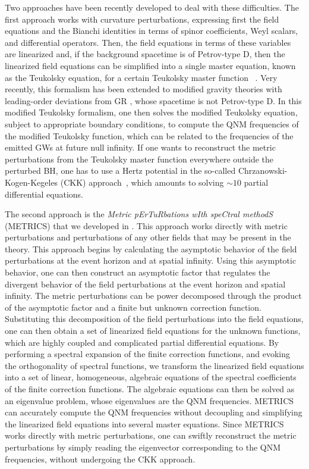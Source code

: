\documentclass[aps,prx,amsmath,floats,floatfix,twocolumn,
  superscriptaddress,nofootinbib,showpacs]{revtex4-1}
\begin{document}
Two approaches have been recently developed to deal with these difficulties. 
The first approach works with curvature perturbations, expressing first the field equations and the Bianchi identities in terms of spinor coefficients, Weyl scalars, and differential operators.
Then, the field equations in terms of these variables are linearized and, if the background spacetime is of Petrov-type D, then the linearized field equations can be simplified into a single master equation, known as the Teukolsky equation, for a certain Teukolsky master function ~\cite{Teukolsky_01_PRL, Teukolsky:1973ha, Press:1973zz, Teukolsky:1974yv}. 
Very recently, this formalism has been extended to modified gravity theories with leading-order deviations from GR \cite{Li:2022pcy,Hussain:2022ins,Wagle:dcsslow,Cano:2023jbk, Cano:2020cao, Cano:2021myl, Cano:2023tmv}, whose spacetime is not Petrov-type D. 
In this modified Teukolsky formalism, one then solves the modified Teukolsky equation, subject to appropriate boundary conditions, to compute the QNM frequencies of the modified Teukolsky function, which can be related to the frequencies of the emitted GWs at future null infinity. 
If one wants to reconstruct the metric perturbations from the Teukolsky master function everywhere outside the perturbed BH, one has to use a Hertz potential in the so-called Chrzanowski-Kogen-Kegeles (CKK) approach~\cite{Chrzanowski:1975wv, Toomani:2021jlo, Whiting_Price_2005, Lousto:2005xu, Ripley:2020xby, Ripley:2022ypi}, which amounts to solving $\sim 10 $ partial differential equations. 

The second approach is the \textit{Metric pErTuRbations wIth speCtral methodS} (METRICS) that we developed in \cite{Chung:2023wkd, Chung:2023zdq}. 
This approach works directly with metric perturbations and perturbations of any other fields that may be present in the theory.
This approach begins by calculating the asymptotic behavior of the field perturbations at the event horizon and at spatial infinity. 
Using this asymptotic behavior, one can then construct an asymptotic factor that regulates the divergent behavior of the field perturbations at the event horizon and spatial infinity. 
The metric perturbations can be power decomposed through the product of the asymptotic factor and a finite but unknown correction function.
Substituting this decomposition of the field perturbations into the field equations, one can then obtain a set of linearized field equations for the unknown functions, which are highly coupled and complicated partial differential equations. 
By performing a spectral expansion of the finite correction functions, and evoking the orthogonality of spectral functions, we transform the linearized field equations into a set of linear, homogeneous, algebraic equations of the spectral coefficients of the finite correction functions. 
The algebraic equations can then be solved as an eigenvalue problem, whose eigenvalues are the QNM frequencies. 
METRICS can accurately compute the QNM frequencies without decoupling and simplifying the linearized field equations into several master equations. 
Since METRICS works directly with metric perturbations, one can swiftly reconstruct the metric perturbations by simply reading the eigenvector corresponding to the QNM frequencies, without undergoing the CKK approach. 
\end{document}
